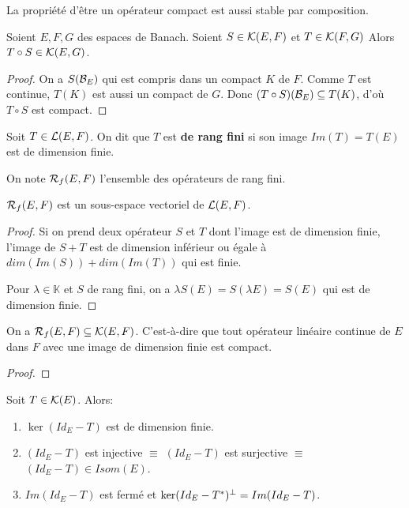 La propriété d'être un opérateur compact est aussi stable par composition.

\begin{proposition}
	Soient $E, F, G$ des espaces de Banach.
	Soient $S \in \mathcal{K}(E, F)$ et $T \in \mathcal{K}(F, G)$
	Alors $T \circ S \in \mathcal{K}(E, G)$.
\end{proposition}

\begin{proof}
	On a $S(\mathcal{B}_{E})$ qui est compris dans un compact $K$ de $F$. Comme $T$ est
	continue, $T(K)$ est aussi un compact de $G$. Donc $(T \circ
	S)(\mathcal{B}_{E}) \subseteq T(K)$, d'où $T \circ S$ est compact.
\end{proof}

\begin{definition}
	Soit $T \in \mathcal{L}(E, F)$. On dit que $T$ est \textbf{de rang fini}
	si son image $Im(T) = T(E)$ est de dimension finie.

	On note $\mathcal{R}_{f}(E, F)$ l'ensemble des opérateurs de rang fini.
\end{definition}

\begin{proposition}
	$\mathcal{R}_{f}(E, F)$ est un sous-espace vectoriel de
	$\mathcal{L}(E, F)$.
\end{proposition}

\begin{proof}
	Si on prend deux opérateur $S$ et $T$ dont l'image est de dimension finie,
	l'image de $S + T$ est de dimension inférieur ou égale à $dim(Im(S)) +
	dim(Im(T))$ qui est finie.

	Pour $\lambda \in \mathbb{K}$ et $S$ de rang fini, on a $\lambda S(E) =
	S(\lambda E) = S(E)$ qui est de dimension finie.
\end{proof}

\begin{proposition}
	On a $\mathcal{R}_{f}(E, F) \subseteq \mathcal{K}(E, F)$. C'est-à-dire
	que tout opérateur linéaire continue de $E$ dans $F$ avec une image de
	dimension finie est compact.
\end{proposition}

\begin{proof}
	
\end{proof}


\begin{proposition}
	Soit $T \in \mathcal{K}(E)$. Alors:

\begin{enumerate}
	\item $\ker(Id_{E} - T)$ est de dimension finie.
	\item $(Id_{E} - T)$ est injective $\equiv$ $(Id_{E} - T)$ est surjective
		$\equiv$ $(Id_{E} - T) \in Isom(E)$.
	\item $Im(Id_{E} - T)$ est fermé et $\ker(Id_{E} - T^{*})^{\perp} = Im(Id_{E}
		- T)$.
\end{enumerate}
\end{proposition}

